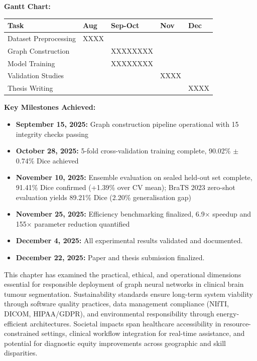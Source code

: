 \textbf{Gantt Chart:}

\begin{center}
\begin{tabularx}{\textwidth} { 
  | >{\raggedright\arraybackslash}X 
  | >{\centering\arraybackslash}X 
  | >{\centering\arraybackslash}X 
  | >{\centering\arraybackslash}X 
  | >{\centering\arraybackslash}X 
  | }
\hline
\textbf{Task} & \textbf{Aug} & \textbf{Sep-Oct} & \textbf{Nov} & \textbf{Dec}\\
\hline
Dataset Preprocessing & \cellcolor{gray!30}XXXX & & &\\
\hline
Graph Construction & & \cellcolor{gray!30}XXXXXXXX & &\\
\hline
Model Training & & \cellcolor{gray!30}XXXXXXXX & &\\
\hline
Validation Studies & & & \cellcolor{gray!30}XXXX &\\
\hline
Thesis Writing & & & & \cellcolor{gray!30}XXXX\\
\hline
\end{tabularx}
\end{center}

\textbf{Key Milestones Achieved:}
\begin{itemize}
    \item \textbf{September 15, 2025:} Graph construction pipeline operational with 15 integrity checks passing
    \item \textbf{October 28, 2025:} 5-fold cross-validation training complete, 90.02\% $\pm$ 0.74\% Dice achieved
    \item \textbf{November 10, 2025:} Ensemble evaluation on sealed held-out set complete, 91.41\% Dice confirmed (+1.39\% over CV mean); BraTS 2023 zero-shot evaluation yields 89.21\% Dice (2.20\% generalisation gap)
    \item \textbf{November 25, 2025:} Efficiency benchmarking finalized, 6.9$\times$ speedup and 155$\times$ parameter reduction quantified
    \item \textbf{December 4, 2025:} All experimental results validated and documented.
    \item \textbf{December 22, 2025:} Paper and thesis submission finalized.
\end{itemize}

\vspace{5mm}

This chapter has examined the practical, ethical, and operational dimensions essential for responsible deployment of graph neural networks in clinical brain tumour segmentation. Sustainability standards ensure long-term system viability through software quality practices, data management compliance (NIfTI, DICOM, HIPAA/GDPR), and environmental responsibility through energy-efficient architectures. Societal impacts span healthcare accessibility in resource-constrained settings, clinical workflow integration for real-time assistance, and potential for diagnostic equity improvements across geographic and skill disparities.

